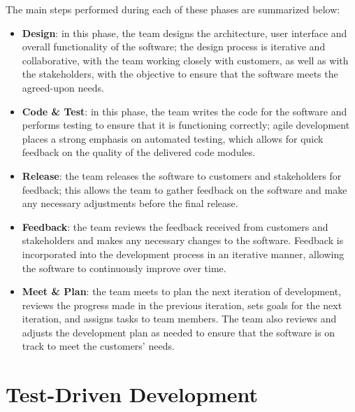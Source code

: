\noindent The main steps performed during each of these phases are summarized below:
\begin{itemize}
    \item \textbf{Design}: in this phase, the team designs the architecture, user interface and overall functionality of the software; the design process is iterative and collaborative, with the team working closely with customers, as well as with the stakeholders, with the objective to ensure that the software meets the agreed-upon needs.
    \item \textbf{Code \& Test}: in this phase, the team writes the code for the software and performs testing to ensure that it is functioning correctly; agile development places a strong emphasis on automated testing, which allows for quick feedback on the quality of the delivered code modules.
    \item \textbf{Release}: the team releases the software to customers and stakeholders for feedback; this allows the team to gather feedback on the software and make any necessary adjustments before the final release.
    \item \textbf{Feedback}: the team reviews the feedback received from customers and stakeholders and makes any necessary changes to the software. Feedback is incorporated into the development process in an iterative manner, allowing the software to continuously improve over time.
    \item \textbf{Meet \& Plan}: the team meets to plan the next iteration of development, reviews the progress made in the previous iteration, sets goals for the next iteration, and assigns tasks to team members. The team also reviews and adjusts the development plan as needed to ensure that the software is on track to meet the customers' needs.
\end{itemize}



\section{Test-Driven Development}
